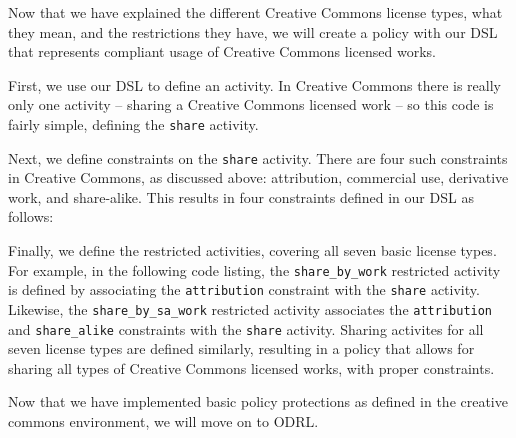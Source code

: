 Now that we have explained the different Creative Commons license types, what
they mean, and the restrictions they have, we will create a policy with our DSL
that represents compliant usage of Creative Commons licensed works.

First, we use our DSL to define an activity.  In Creative Commons there is
really only one activity --  sharing a Creative Commons licensed work -- so
this code is fairly simple, defining the \texttt{share} activity.



Next, we define constraints on the \texttt{share} activity.  There are four
such constraints in Creative Commons, as discussed above: attribution,
commercial use, derivative work, and share-alike.  This results in four
constraints defined in our DSL as follows:



Finally, we define the restricted activities, covering all seven basic license
types.  For example, in the following code listing, the
\texttt{share\_by\_work} restricted activity is defined by associating the
\texttt{attribution} constraint with the \texttt{share} activity. Likewise, the
\texttt{share\_by\_sa\_work} restricted activity associates the
\texttt{attribution} and \texttt{share\_alike} constraints with the
\texttt{share} activity.  Sharing activites for all seven license types are defined
similarly, resulting in a policy that allows for sharing all types of Creative
Commons licensed works, with proper constraints.



Now that we have implemented basic policy protections as defined in the creative commons environment, we will move on to ODRL.